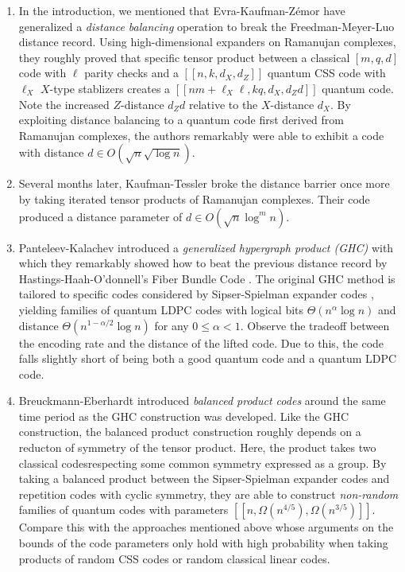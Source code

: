 \documentclass[12pt]{article}%
\theoremstyle{definition}
\begin{document}
\begin{enumerate}
  \item In the introduction, we mentioned that Evra-Kaufman-Z\'emor have generalized a \emph{distance balancing} operation to break the Freedman-Meyer-Luo distance record. Using high-dimensional expanders on Ramanujan complexes, they roughly proved that specific tensor product between a classical $[m, q, d]$ code with $\ell$ parity checks and a $[[n, k ,d_X, d_Z]]$ quantum CSS code with $\ell_X$ $X$-type stablizers creates a $[[nm + \ell_X\ell, kq, d_X, d_Zd]]$ quantum code. Note the increased $Z$-distance $d_Zd$ relative to the $X$-distance $d_X$. By exploiting distance balancing to a quantum code first derived from Ramanujan complexes, the authors remarkably were able to exhibit a code with distance $d \in O(\sqrt{n} \sqrt{\log{n}})$.
  \item Several months later, Kaufman-Tessler \cite{kaufman2021new} broke the distance barrier once more by taking iterated tensor products of Ramanujan complexes. Their code produced a distance parameter of $d \in O(\sqrt{n} \log^m{n})$.
  \item Panteleev-Kalachev introduced a \emph{generalized hypergraph product (GHC)} \cite{panteleev2021degenerate} with which they remarkably showed how to beat the previous distance record by Hastings-Haah-O'donnell's Fiber Bundle Code \cite{hastings2021fiber}. The original GHC method is tailored to specific codes considered by Sipser-Spielman expander codes \cite{sipser1996expander}, yielding families of quantum LDPC codes with logical bits $\Theta(n^\alpha \log{n})$ and distance $\Theta(n^{1 - \alpha/2}\log{n})$ for any $0 \leq \alpha < 1$. Observe the tradeoff between the encoding rate and the distance of the lifted code. Due to this, the code falls slightly short of being both a good quantum code and a quantum LDPC code.
  \item Breuckmann-Eberhardt introduced \emph{balanced product codes} \cite{breuckmann2021balanced} around the same time period as the GHC construction was developed. Like the GHC construction, the balanced product construction roughly depends on a reducton of symmetry of the tensor product. Here, the product takes two classical codesrespecting some common symmetry expressed as a group. By taking a balanced product between the Sipser-Spielman expander codes and repetition codes with cyclic symmetry, they are able to construct \emph{non-random} families of quantum codes with parameters $[[n, \Omega(n^{4/5}), \Omega(n^{3/5})]]$. Compare this with the approaches mentioned above whose arguments on the bounds of the code parameters only hold with high probability when taking products of random CSS codes or random classical linear codes. 
\end{enumerate}
\end{document}

